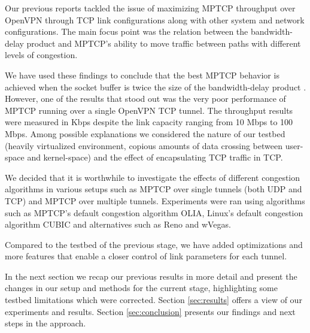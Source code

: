 Our previous reports tackled the issue of maximizing MPTCP throughput over OpenVPN through TCP link configurations along with other system and network configurations. The main focus point was the relation between the bandwidth-delay product and MPTCP's ability to move traffic between paths with different levels of congestion.

We have used these findings to conclude that the best MPTCP behavior is achieved when the socket buffer is twice the size of the bandwidth-delay product \cite{sem2}. However, one of the results that stood out was the very poor performance of MPTCP running over a single OpenVPN TCP tunnel. The throughput results were measured in Kbps despite the link capacity ranging from 10 Mbps to 100 Mbps. Among possible explanations we considered the nature of our testbed (heavily virtualized environment, copious amounts of data crossing between user-space and kernel-space) and the effect of encapsulating TCP traffic in TCP.

We decided that it is worthwhile to investigate the effects of different congestion algorithms in various setups such as MPTCP over single tunnels (both UDP and TCP) and MPTCP over multiple tunnels. Experiments were ran using algorithms such as MPTCP's default congestion algorithm OLIA, Linux's default congestion algorithm CUBIC and alternatives such as Reno and wVegas.

Compared to the testbed of the previous stage, we have added optimizations and more features that enable a closer control of link parameters for each tunnel.

In the next section we recap our previous results in more detail and present the changes in our setup and methods for the current stage, highlighting some testbed limitations which were corrected. Section \ref{sec:results} offers a view of our experiments and results. Section \ref{sec:conclusion} presents our findings and next steps in the approach.
